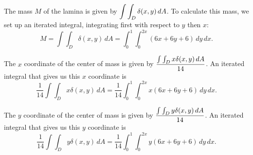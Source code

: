 \begin{activitySolution}
\ba
\item The mass $M$ of the lamina is given by $\displaystyle \int \int_D \delta(x,y) \, dA$. To calculate this mass, we set up an iterated integral, integrating first with respect to $y$ then $x$:
\[M = \int \int_D \delta(x,y) \, dA = \int_0^1 \int_0^{2x} (6x+6y+6) \, dy \, dx.\]

\item The $x$ coordinate of the center of mass is given by $\displaystyle \frac{\int \int_D x \delta(x,y) \, dA}{14}$. An iterated integral that gives us this $x$ coordinate is 
\[\frac{1}{14}\int \int_D x \delta(x,y) \, dA = \frac{1}{14} \int_0^1 \int_0^{2x} x(6x+6y+6) \, dy \, dx.\]

The $y$ coordinate of the center of mass is given by $\displaystyle \frac{\int \int_D y \delta(x,y) \, dA}{14}$. An iterated integral that gives us this $y$ coordinate is 
\[\frac{1}{14}\int \int_D y \delta(x,y) \, dA = \frac{1}{14} \int_0^1 \int_0^{2x} y(6x+6y+6) \, dy \, dx.\]
\ea

\end{activitySolution}
\aftera
